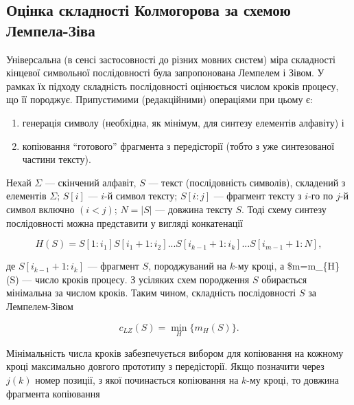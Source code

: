 \documentclass[
  letterpaper,
]{report}
\providecommand{\tightlist}{%
  \setlength{\itemsep}{0pt}\setlength{\parskip}{0pt}}\usepackage{longtable,booktabs,array}
\begin{document}
\hypertarget{ux43eux446ux456ux43dux43aux430-ux441ux43aux43bux430ux434ux43dux43eux441ux442ux456-ux43aux43eux43bux43cux43eux433ux43eux440ux43eux432ux430-ux437ux430-ux441ux445ux435ux43cux43eux44e-ux43bux435ux43cux43fux435ux43bux430-ux437ux456ux432ux430}{%
\subsection{Оцінка складності Колмогорова за схемою
Лемпела-Зіва}\label{ux43eux446ux456ux43dux43aux430-ux441ux43aux43bux430ux434ux43dux43eux441ux442ux456-ux43aux43eux43bux43cux43eux433ux43eux440ux43eux432ux430-ux437ux430-ux441ux445ux435ux43cux43eux44e-ux43bux435ux43cux43fux435ux43bux430-ux437ux456ux432ux430}}

Універсальна (в сенсі застосовності до різних мовних систем) міра
складності кінцевої символьної послідовності була запропонована Лемпелем
і Зівом. У рамках їх підходу складність послідовності оцінюється числом
кроків процесу, що її породжує. Припустимими (редакційними) операціями
при цьому є:

\begin{enumerate}
\def\labelenumi{\arabic{enumi}.}
\tightlist
\item
  генерація символу (необхідна, як мінімум, для синтезу елементів
  алфавіту) і
\item
  копіювання ``готового'' фрагмента з передісторії (тобто з уже
  синтезованої частини тексту).
\end{enumerate}

Нехай \(\Sigma\) --- скінчений алфавіт, \(S\) --- текст (послідовність
символів), складений з елементів \(\Sigma\); \(S[i]\) --- \(i\)-й символ
тексту; \(S[i:j]\) --- фрагмент тексту з \(i\)-го по \(j\)-й символ
включно \((i<j)\); \(N=|S|\) --- довжина тексту \(S\). Тоді схему
синтезу послідовності можна представити у вигляді конкатенації

\[
H(S)=S[1:i_1]S[i_1+1:i_2]...S[i_{k-1}+1:i_k]...S[i_{m−1}+1:N], \tag{1}
\]

де \(S[i_{k−1}+1:i_k]\) --- фрагмент \(S\), породжуваний на \(k\)-му
кроці, а \$m=m\_\{H\}(S) --- число кроків процесу. З усіляких схем
породження \(S\) обирається мінімальна за числом кроків. Таким чином,
складність послідовності \(S\) за Лемпелем-Зівом

\[
c_{LZ}(S) = \min_{H}\{ m_{H}(S) \}. 
\]

Мінімальність числа кроків забезпечується вибором для копіювання на
кожному кроці максимально довгого прототипу з передісторії. Якщо
позначити через \(j(k)\) номер позиції, з якої починається копіювання на
\(k\)-му кроці, то довжина фрагмента копіювання
\end{document}
